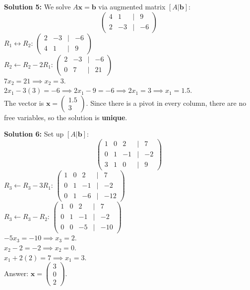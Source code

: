 \documentclass{article}
\begin{document}
\textbf{Solution 5:}
We solve $A\mathbf{x} = \mathbf{b}$ via augmented matrix $[A | \mathbf{b}]$:
$$\begin{pmatrix} 4 & 1 & | & 9 \\ 2 & -3 & | & -6 \end{pmatrix}$$
$R_1 \leftrightarrow R_2$: $\begin{pmatrix} 2 & -3 & | & -6 \\ 4 & 1 & | & 9 \end{pmatrix}$ \\
$R_2 \leftarrow R_2 - 2R_1$: $\begin{pmatrix} 2 & -3 & | & -6 \\ 0 & 7 & | & 21 \end{pmatrix}$ \\
$7x_2 = 21 \implies x_2 = 3$. \\
$2x_1 - 3(3) = -6 \implies 2x_1 - 9 = -6 \implies 2x_1 = 3 \implies x_1 = 1.5$. \\
The vector is $\mathbf{x} = \begin{pmatrix} 1.5 \\ 3 \end{pmatrix}$. Since there is a pivot in every column, there are no free variables, so the solution is \textbf{unique}.

\textbf{Solution 6:}
Set up $[A | \mathbf{b}]$:
$$\begin{pmatrix} 1 & 0 & 2 & | & 7 \\ 0 & 1 & -1 & | & -2 \\ 3 & 1 & 0 & | & 9 \end{pmatrix}$$
$R_3 \leftarrow R_3 - 3R_1$: $\begin{pmatrix} 1 & 0 & 2 & | & 7 \\ 0 & 1 & -1 & | & -2 \\ 0 & 1 & -6 & | & -12 \end{pmatrix}$ \\
$R_3 \leftarrow R_3 - R_2$: $\begin{pmatrix} 1 & 0 & 2 & | & 7 \\ 0 & 1 & -1 & | & -2 \\ 0 & 0 & -5 & | & -10 \end{pmatrix}$ \\
$-5x_3 = -10 \implies x_3 = 2$. \\
$x_2 - 2 = -2 \implies x_2 = 0$. \\
$x_1 + 2(2) = 7 \implies x_1 = 3$. \\
Answer: $\mathbf{x} = \begin{pmatrix} 3 \\ 0 \\ 2 \end{pmatrix}$.
\end{document}
